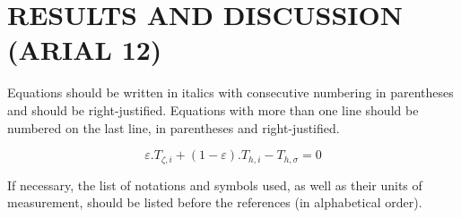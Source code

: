 \documentclass[
	article,			%
	12pt,				%
	oneside,			%
	a4paper,			%
	english,			%
	brazil,				%
	sumario=tradicional
	]{abntex2}
\begin{document}
\begin{table}[h]
   \renewcommand{\arraystretch}{1.2}
   \centering
\end{table}

\section{\textbf{RESULTS AND DISCUSSION (ARIAL 12)}}

Equations should be written in italics with consecutive numbering in parentheses and should be right-justified. Equations with more than one line should be numbered on the last line, in parentheses and right-justified.


\begin{equation}
   \varepsilon . T_{\zeta, i} + (1 - \varepsilon).T_{h, i} - T_{h, \sigma} = 0
\end{equation}


If necessary, the list of notations and symbols used, as well as their units of measurement, should be listed before the references (in alphabetical order).

% 
\end{document}
